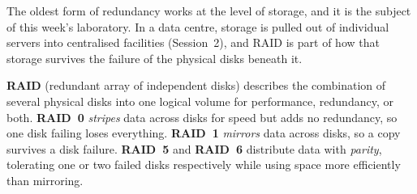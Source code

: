 The oldest form of redundancy works at the level of storage, and it is the
subject of this week's laboratory. In a data centre, storage is pulled out
of individual servers into centralised facilities (Session~2), and RAID is
part of how that storage survives the failure of the physical disks beneath
it.

\begin{definition}[RAID]\label{def:raid}
\textbf{RAID} (redundant array of independent disks) describes the
combination of several physical disks into one logical volume for
performance, redundancy, or both. \textbf{RAID~0} \emph{stripes} data across
disks for speed but adds no redundancy, so one disk failing loses everything.
\textbf{RAID~1} \emph{mirrors} data across disks, so a copy survives a disk
failure. \textbf{RAID~5} and \textbf{RAID~6} distribute data with
\emph{parity}, tolerating one or two failed disks respectively while using
space more efficiently than mirroring.
\end{definition}

